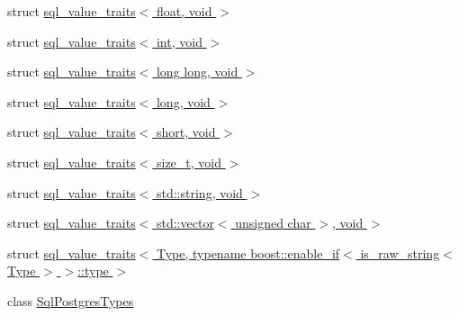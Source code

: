 \begin{DoxyCompactItemize}
\item 
struct \hyperlink{structdbo_1_1traits_1_1sql__value__traits_3_01float_00_01void_01_4}{sql\+\_\+value\+\_\+traits$<$ float, void $>$}
\item 
struct \hyperlink{structdbo_1_1traits_1_1sql__value__traits_3_01int_00_01void_01_4}{sql\+\_\+value\+\_\+traits$<$ int, void $>$}
\item 
struct \hyperlink{structdbo_1_1traits_1_1sql__value__traits_3_01long_01long_00_01void_01_4}{sql\+\_\+value\+\_\+traits$<$ long long, void $>$}
\item 
struct \hyperlink{structdbo_1_1traits_1_1sql__value__traits_3_01long_00_01void_01_4}{sql\+\_\+value\+\_\+traits$<$ long, void $>$}
\item 
struct \hyperlink{structdbo_1_1traits_1_1sql__value__traits_3_01short_00_01void_01_4}{sql\+\_\+value\+\_\+traits$<$ short, void $>$}
\item 
struct \hyperlink{structdbo_1_1traits_1_1sql__value__traits_3_01size__t_00_01void_01_4}{sql\+\_\+value\+\_\+traits$<$ size\+\_\+t, void $>$}
\item 
struct \hyperlink{structdbo_1_1traits_1_1sql__value__traits_3_01std_1_1string_00_01void_01_4}{sql\+\_\+value\+\_\+traits$<$ std\+::string, void $>$}
\item 
struct \hyperlink{structdbo_1_1traits_1_1sql__value__traits_3_01std_1_1vector_3_01unsigned_01char_01_4_00_01void_01_4}{sql\+\_\+value\+\_\+traits$<$ std\+::vector$<$ unsigned char $>$, void $>$}
\item 
struct \hyperlink{structdbo_1_1traits_1_1sql__value__traits_3_01_type_00_01typename_01boost_1_1enable__if_3_01is__aa5117fa5e949e5d70ea0660f0e85288}{sql\+\_\+value\+\_\+traits$<$ Type, typename boost\+::enable\+\_\+if$<$ is\+\_\+raw\+\_\+string$<$ Type $>$ $>$\+::type $>$}
\item 
class \hyperlink{classdbo_1_1traits_1_1_sql_postgres_types}{Sql\+Postgres\+Types}
\end{DoxyCompactItemize}
